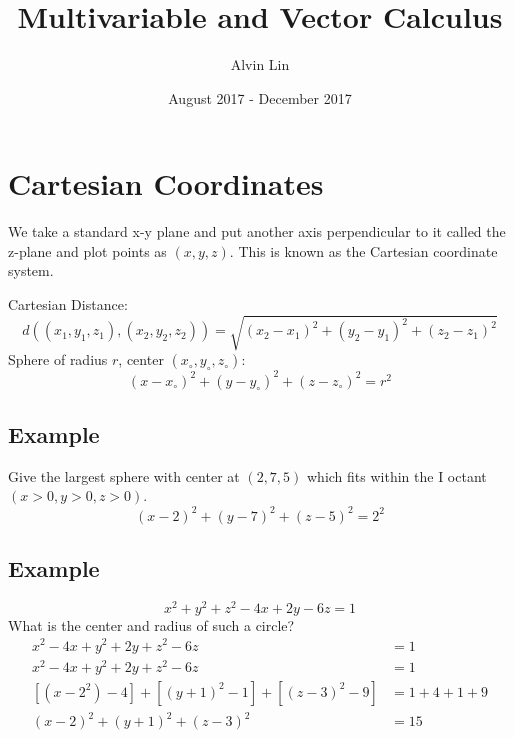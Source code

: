 \documentclass{math}
\title{Multivariable and Vector Calculus}
\author{Alvin Lin}
\date{August 2017 - December 2017}
\begin{document}
\maketitle

\section*{Cartesian Coordinates}
We take a standard x-y plane and put another axis perpendicular to it called
the z-plane and plot points as \( (x, y, z) \). This is known as the Cartesian
coordinate system.
\begin{center}
\end{center}

\noindent Cartesian Distance:
\[ d((x_{1}, y_{1}, z_{1}), (x_{2}, y_{2}, z_{2})) = \sqrt{
  (x_{2}-x_{1})^{2}+(y_{2}-y_{1})^{2}+(z_{2}-z_{1})^{2}} \]
Sphere of radius \( r \), center \( (x_{\circ},y_{\circ},z_{\circ}) \):
\[ (x-x_{\circ})^{2}+(y-y_{\circ})^{2}+(z-z_{\circ})^{2} = r^{2} \]

\subsection*{Example}
Give the largest sphere with center at \( (2,7,5) \) which fits within the I
octant \( (x>0,y>0,z>0) \).
\[ (x-2)^{2}+(y-7)^{2}+(z-5)^{2} = 2^{2} \]

\subsection*{Example}
\[ x^{2}+y^{2}+z^{2}-4x+2y-6z = 1 \]
What is the center and radius of such a circle?
\begin{align*}
  x^{2}-4x+y^{2}+2y+z^{2}-6z &= 1 \\
  x^{2}-4x+y^{2}+2y+z^{2}-6z &= 1 \\
  [(x-2^{2})-4]+[(y+1)^{2}-1]+[(z-3)^{2}-9] &= 1+4+1+9 \\
  (x-2)^{2}+(y+1)^{2}+(z-3)^{2} &= 15 \\
\end{align*}
\end{document}
